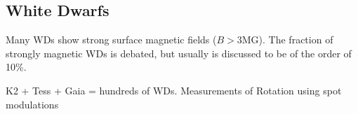 {\color{red} \subsection{White Dwarfs}}
Many WDs show strong surface magnetic fields ($B>$3MG). The fraction of strongly magnetic WDs is debated, but usually is discussed to be of the order of 10\%.  

K2 + Tess + Gaia = hundreds of WDs. Measurements of Rotation using spot modulations